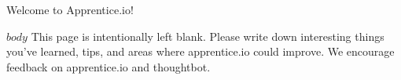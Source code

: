 \documentclass{book}
\begin{document}


  \vspace*{\fill}
    \begin{center}
      {\Huge Welcome to Apprentice.io!}
    \end{center}
  \vspace*{\fill}

  \clearpage

  \setcounter{page}{0}


  $body$
  \cleardoublepage
  This page is intentionally left blank. Please write down interesting things
  you've learned, tips, and areas where apprentice.io could improve. We encourage
  feedback on apprentice.io and thoughtbot.
\end{document}
